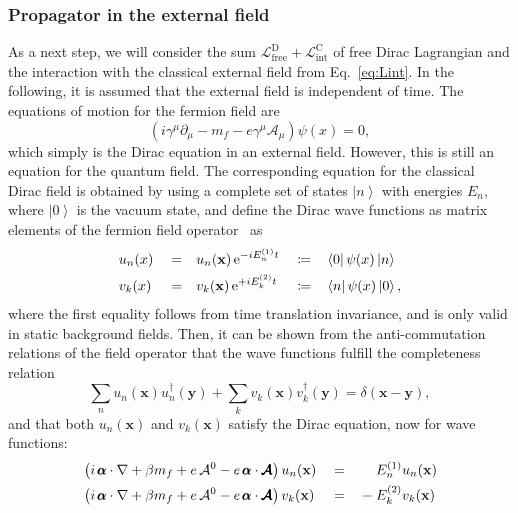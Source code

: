 \subsubsection*{Propagator in the external field}
As a next step, we will consider the sum $\mathcal{L}_{\text{free}}^{\text{D}} + \mathcal{L}_{\text{int}}^{\text{C}}$ of free Dirac Lagrangian  and the interaction with the classical external field  from Eq.~\eqref{eq:Lint}. In the following, it is assumed that the external field is independent of time. The equations of motion for the fermion field are
\begin{equation}
\left( i \gamma^\mu \partial_\mu - m_f - e \gamma^\mu \mathcal{A}_\mu \right)
\psi(x) = 0,
\end{equation}
which simply is the Dirac equation in an external field. However, this is still an equation for the quantum field. The corresponding equation for the classical Dirac field is obtained by using a complete set of states $\left|n\right>$ with energies $E_n$, where $\left|0\right>$ is the vacuum state, and define the Dirac wave functions as matrix elements of the fermion field operator~\mbox{\cite[Section 14.1]{weinberg2005}} as
\begin{alignat}{5}
&u_n(x)&&=&&u_n(\mathbf{x})\,\text{e}^{-iE^{(1)}_nt}&&\coloneqq&&\left<0\right|\psi(x)\left|n\right>\notag\\
&v_k(x)&&=&&v_k(\mathbf{x})\,\text{e}^{+iE^{(2)}_kt}&&\coloneqq&&\left<n\right|\psi(x)\left|0\right>,
\label{eq:wavefct}
\end{alignat}
where the first equality follows from time translation invariance, and is only valid in static background fields. 
Then, it can be shown from the anti-commutation relations of the field operator that the wave functions fulfill the completeness relation
\begin{equation}
\sum_n u_n(\mathbf{x})u_n^\dagger(\mathbf{y}) + \sum_k v_k(\mathbf{x})v_k^\dagger(\mathbf{y})=\delta(\mathbf{x}-\mathbf{y}),
\end{equation}
and that both $u_n(\mathbf{x})$ and $v_k(\mathbf{x})$ satisfy the Dirac equation, now for wave functions:
\begin{alignat}{3}
& \left( i\,\pmb{\alpha} \cdot \mathbf{\nabla} + \beta m_f + e\, \mathcal{A}^0 - e\, \pmb{\alpha}\cdot \pmb{\mathcal{A}} \right) u_n(\mathbf{x}) &&=&& \phantom{-}\;\, E^{(1)}_n u_n(\mathbf{x}) \notag\\
& \left( i\,\pmb{\alpha} \cdot \mathbf{\nabla} + \beta m_f + e\, \mathcal{A}^0 - e\, \pmb{\alpha}\cdot \pmb{\mathcal{A}} \right) v_k(\mathbf{x}) &&=&& -E^{(2)}_k v_k(\mathbf{x})
\label{eq:diraceq}
\end{alignat}
